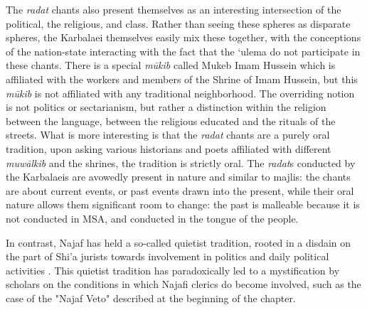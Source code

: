The \emph{radat} chants also present themselves as an interesting intersection of the political, the religious, and class. Rather than seeing these spheres as disparate spheres, the Karbalaei themselves easily mix these together, with the conceptions of the nation-state interacting with the fact that the ‘ulema do not participate in these chants. There is a special \emph{mūkib} called Mukeb Imam Hussein which is affiliated with the workers and members of the Shrine of Imam Hussein, but this \emph{mūkib} is not affiliated with any traditional neighborhood. The overriding notion is not politics or sectarianism, but rather a distinction within the religion between the language, between the religious educated and the rituals of the streets. What is more interesting is that the \emph{radat} chants are a purely oral tradition, upon asking various historians and poets affiliated with different \emph{muwālkib} and the shrines, the tradition is strictly oral. The \emph{radat}s conducted by the Karbalaeis are avowedly present in nature and similar to majlis: the chants are about current events, or past events drawn into the present, while their oral nature allows them significant room to change: the past is malleable because it is not conducted in MSA, and conducted in the tongue of the people. 

In contrast, Najaf has held a so-called quietist tradition, rooted in a disdain on the part of Shi'a jurists towards involvement in politics and daily political activities \cite[216]{hamdan_development_2012}. This quietist tradition has paradoxically led to a mystification by scholars on the conditions in which Najafi clerics do become involved, such as the case of the "Najaf Veto" described at the beginning of the chapter. 

